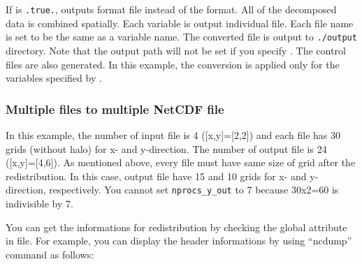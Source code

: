 
If  is \verb|.true.|, \sno outputs \grads format file instead of the \scalenetcdf format. All of the decomposed data is combined spatially. Each variable is output individual file. Each file name is set to be the same as a variable name. The converted file is output to \verb|./output| directory. Note that the output path will not be set if you specify . The control files are also generated.
In this example, the conversion is applied only for the variables specified by .

\subsubsection{Multiple \scalenetcdf files to multiple NetCDF file}


In this example, the number of input file is 4 ([x,y]=[2,2]) and each file has 30 grids (without halo) for x- and y-direction. The number of output file is 24 ([x,y]=[4,6]). As mentioned above, every file must have same size of grid after the redistribution. In this case, output file have 15 and 10 grids for x- and y- direction, respectively. You cannot set \verb|nprocs_y_out| to 7 because 30x2=60 is indivisible by 7.

You can get the informations for redistribution by checking the global attribute in \scalenetcdf file. For example, you can display the header informations by using ``ncdump'' command as follows:

